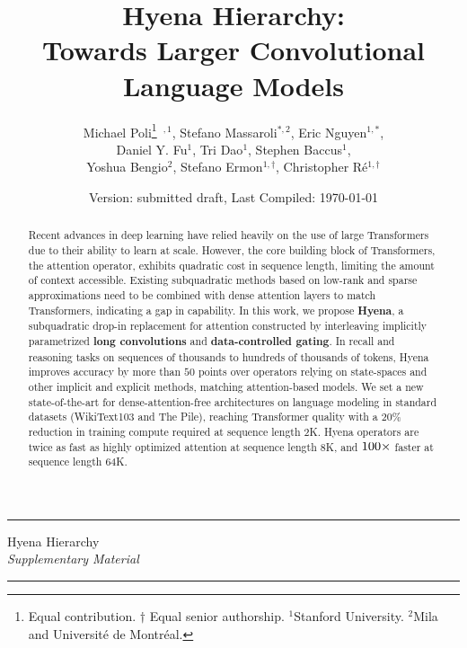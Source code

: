 \documentclass{article}
\title{\huge {Hyena Hierarchy:}\\Towards Larger Convolutional Language Models}
\author{Michael Poli\footnote{Equal contribution. $\dagger$ Equal senior authorship. $^1$Stanford University. $^2$Mila and Universit\'e de Montr\'eal.}~$^{,1}$, Stefano Massaroli$^{*,2}$, Eric Nguyen$^{1,*}$, \\ Daniel Y. Fu$^1$, Tri Dao$^1$, Stephen Baccus$^1$, \\ Yoshua Bengio$^2$, Stefano Ermon$^{1,\dagger}$, Christopher R\'e$^{1,\dagger}$
 }
\date{\small{\footnotesize\sf Version}: submitted draft, {\footnotesize\sf  Last Compiled}: \today}
\begin{document}
\maketitle
%
 \begin{abstract}
    Recent advances in deep learning have relied heavily on the use of large Transformers due to their ability to learn at scale. However, the core building block of Transformers, the attention operator, exhibits quadratic cost in sequence length, limiting the amount of context accessible. Existing subquadratic methods based on low-rank and sparse approximations need to be combined with dense attention layers to match Transformers, indicating a gap in capability. In this work, we propose \textbf{Hyena}, a subquadratic drop-in replacement for attention constructed by interleaving implicitly parametrized \textbf{long convolutions} and \textbf{data-controlled gating}. In recall and reasoning tasks on sequences of thousands to hundreds of thousands of tokens, Hyena improves accuracy by more than $50$ points over operators relying on state-spaces and other implicit and explicit methods, matching attention-based models. We set a new state-of-the-art for dense-attention-free architectures on language modeling in standard datasets ({\sc WikiText103} and {\sc The Pile}), reaching Transformer quality with a $20\%$ reduction in training compute required at sequence length $2$K. Hyena operators are twice as fast as highly optimized attention at sequence length $8$K, and $100\times$ faster at sequence length $64$K.
\end{abstract}
%

\setlength\abovedisplayshortskip{2pt}
\setlength\belowdisplayshortskip{2pt}
\setlength\abovedisplayskip{2pt}
\setlength\belowdisplayskip{2pt}










\clearpage
\appendix
%
\rule[0pt]{\columnwidth}{1pt}
\begin{center}
    \huge{Hyena Hierarchy} \\
    \vspace{0.3cm}
    \emph{Supplementary Material}
\end{center}
\rule[0pt]{\columnwidth}{1.5pt}
%
\doparttoc
\tableofcontents
%




%
\end{document}
